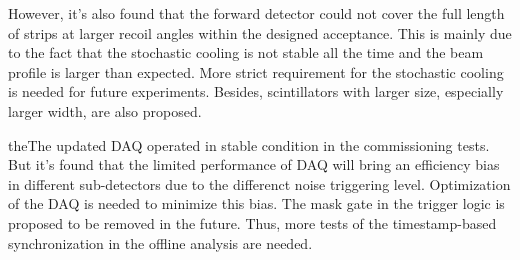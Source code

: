 \documentclass[number,5p]{elsarticle}
\begin{document}
However, it's also found that the forward detector could not cover the full
length of strips at larger recoil angles within the designed acceptance.
This is mainly due to the fact that the stochastic cooling is not stable all the time
and the beam profile is larger than expected.
More strict requirement for the stochastic cooling is needed for future experiments.
Besides, scintillators with larger size, especially larger width, are also proposed.

theThe updated DAQ operated in stable condition in the commissioning tests.
But it's found that the limited performance of DAQ will bring an efficiency bias in different
sub-detectors due to the differenct noise triggering level.
Optimization of the DAQ is needed to minimize this bias.
The mask gate in the trigger logic is proposed to be removed in the future.
Thus, more tests of the timestamp-based synchronization in the offline analysis are needed.



\end{document}
